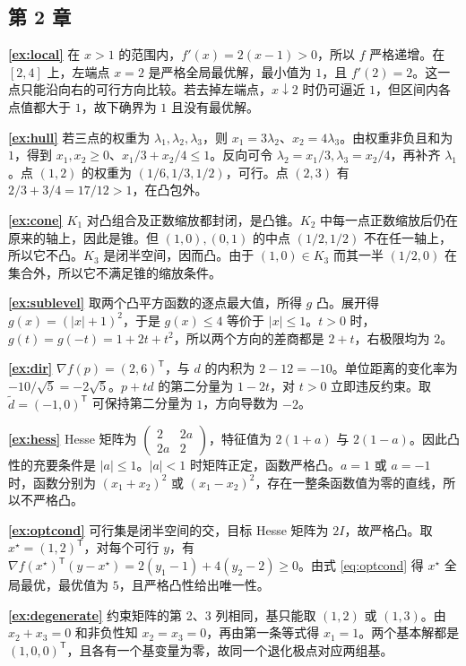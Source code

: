 \documentclass[UTF8,fontset=none,zihao=-4,a4paper]{ctexart}
\newcommand{\ans}[1]{\par\Needspace{3\baselineskip}\noindent\textbf{\ref{#1}}\quad}
\newcommand{\transpose}{^{\mathsf T}}
\begin{document}
\subsection*{第 2 章}
\ans{ex:local}
在 $x>1$ 的范围内，$f'(x)=2(x-1)>0$，所以 $f$ 严格递增。在 $[2,4]$ 上，左端点 $x=2$ 是严格全局最优解，最小值为 $1$，且 $f'(2)=2$。这一点只能沿向右的可行方向比较。若去掉左端点，$x\downarrow2$ 时仍可逼近 $1$，但区间内各点值都大于 $1$，故下确界为 $1$ 且没有最优解。

\ans{ex:hull}
若三点的权重为 $\lambda_1,\lambda_2,\lambda_3$，则 $x_1=3\lambda_2$、$x_2=4\lambda_3$。由权重非负且和为 $1$，得到 $x_1,x_2\ge0$、$x_1/3+x_2/4\le1$。反向可令 $\lambda_2=x_1/3,\lambda_3=x_2/4$，再补齐 $\lambda_1$。点 $(1,2)$ 的权重为 $(1/6,1/3,1/2)$，可行。点 $(2,3)$ 有 $2/3+3/4=17/12>1$，在凸包外。

\ans{ex:cone}
$K_1$ 对凸组合及正数缩放都封闭，是凸锥。$K_2$ 中每一点正数缩放后仍在原来的轴上，因此是锥。但 $(1,0),(0,1)$ 的中点 $(1/2,1/2)$ 不在任一轴上，所以它不凸。$K_3$ 是闭半空间，因而凸。由于 $(1,0)\in K_3$ 而其一半 $(1/2,0)$ 在集合外，所以它不满足锥的缩放条件。

\ans{ex:sublevel}
取两个凸平方函数的逐点最大值，所得 $g$ 凸。展开得 $g(x)=(|x|+1)^2$，于是 $g(x)\le4$ 等价于 $|x|\le1$。$t>0$ 时，$g(t)=g(-t)=1+2t+t^2$，所以两个方向的差商都是 $2+t$，右极限均为 $2$。

\ans{ex:dir}
$\nabla f(p)=(2,6)\transpose$，与 $d$ 的内积为 $2-12=-10$。单位距离的变化率为 $-10/\sqrt5=-2\sqrt5$。$p+td$ 的第二分量为 $1-2t$，对 $t>0$ 立即违反约束。取 $\tilde d=(-1,0)\transpose$ 可保持第二分量为 $1$，方向导数为 $-2$。

\ans{ex:hess}
Hesse 矩阵为 $\begin{pmatrix}2&2a\\2a&2\end{pmatrix}$，特征值为 $2(1+a)$ 与 $2(1-a)$。因此凸性的充要条件是 $|a|\le1$。$|a|<1$ 时矩阵正定，函数严格凸。$a=1$ 或 $a=-1$ 时，函数分别为 $(x_1+x_2)^2$ 或 $(x_1-x_2)^2$，存在一整条函数值为零的直线，所以不严格凸。

\ans{ex:optcond}
可行集是闭半空间的交，目标 Hesse 矩阵为 $2I$，故严格凸。取 $x^\star=(1,2)\transpose$，对每个可行 $y$，有 $\nabla f(x^\star)\transpose(y-x^\star)=2(y_1-1)+4(y_2-2)\ge0$。由式 \eqref{eq:optcond} 得 $x^\star$ 全局最优，最优值为 $5$，且严格凸性给出唯一性。

\ans{ex:degenerate}
约束矩阵的第 2、3 列相同，基只能取 $(1,2)$ 或 $(1,3)$。由 $x_2+x_3=0$ 和非负性知 $x_2=x_3=0$，再由第一条等式得 $x_1=1$。两个基本解都是 $(1,0,0)\transpose$，且各有一个基变量为零，故同一个退化极点对应两组基。
\end{document}
